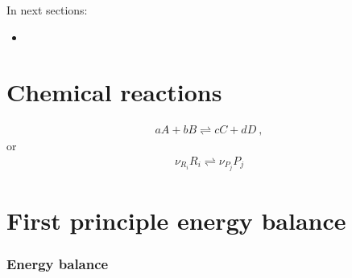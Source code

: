 \documentclass[letterpaper,10pt,english]{jupyterBook}
\begin{document}
\sphinxAtStartPar
In next sections:
\begin{itemize}
\item {} 
\sphinxAtStartPar
{\hyperref[\detokenize{ch/batteries:electro-chemical-batteries}]{}}

\end{itemize}


\section{Chemical reactions}
\label{\detokenize{ch/principles-electrochemical:chemical-reactions}}\label{\detokenize{ch/principles-electrochemical:physics-thermodynamics-foundation-principles-electro-chemical-reactions}}\begin{equation*}
\begin{split}a A + b B \rightleftharpoons c C + d D \ ,\end{split}
\end{equation*}
\sphinxAtStartPar
or
\begin{equation}\label{equation:ch/principles-electrochemical:eq:reaction:stoichiometry}
\begin{split}\nu_{R_i}  R_i \rightleftharpoons \nu_{P_j} P_j\end{split}
\end{equation}

\section{First principle \sphinxhyphen{} energy balance}
\label{\detokenize{ch/principles-electrochemical:first-principle-energy-balance}}\label{\detokenize{ch/principles-electrochemical:physics-thermodynamics-foundation-principles-electro-chemical-first-principle}}\subsubsection*{Energy balance}
\end{document}
